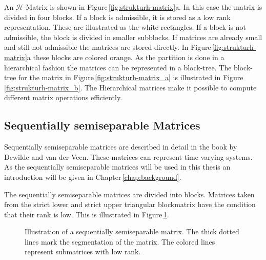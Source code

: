 \documentclass[numbers=noenddot,doctype=mastersthesis,BCOR=15mm,biblatex]{ldvbook}%
\begin{document}
An $\mathcal{H}$-Matrix is shown in Figure\,\ref{fig:strukturh-matrix}a. 
In this case the matrix is divided in four blocks.
If a block is admissible, it is stored as a low rank representation. These are illustrated as the white rectangles.
If a block is not admissible, the block is divided in smaller subblocks.
If matrices are already small and still not admissible the matrices are stored directly. In Figure\,\ref{fig:strukturh-matrix}a these blocks are colored orange.
As the partition is done in a hierarchical fashion the matrices can be represented in a block-tree. 
The block-tree for the matrix in Figure\,\ref{fig:strukturh-matrix_a} is illustrated in Figure\,\ref{fig:strukturh-matrix_b}.
The Hierarchical matrices make it possible to compute different matrix operations efficiently. %

\subsection{Sequentially semiseparable Matrices}
Sequentially semiseparable matrices are described in detail in the book by Dewilde and van der Veen\cite{dewilde_time-varying_1998}.
These matrices can represent time varying systems.
As the sequentially semiseparable matrices will be used in this thesis an introduction will be given in Chapter\,\ref{chap:background}. 

The sequentially semiseparable matrices are divided into blocks.
Matrices taken from the strict lower and strict upper triangular blockmatrix have the condition that their rank is low.
This is illustrated in Figure\,\ref{fig:sequentiallysep}.

\begin{figure}[htb]
	\centering
	
	\caption{Illustration of a sequentially semiseparable matrix. The thick dotted lines mark the segmentation of the matrix. The colored lines represent submatrices with low rank.}
	\label{fig:sequentiallysep}
\end{figure}
\end{document}

